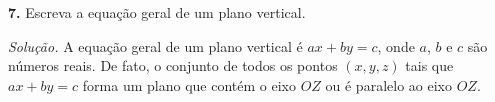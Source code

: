 \documentclass[a4paper,11pt]{article}
\begin{document}
\vspace{\baselineskip}

\textbf{7.}
Escreva a equação geral de um plano vertical.

\vspace{\baselineskip}

\emph{Solução.}
A equação geral de um plano vertical é $ax + by = c$, onde $a$, $b$ e $c$ são números reais.
De fato, o conjunto de todos os pontos $(x,y,z)$ tais que $ax + by = c$ forma um plano que contém o eixo $OZ$ ou é paralelo ao eixo $OZ$.
\end{document}
